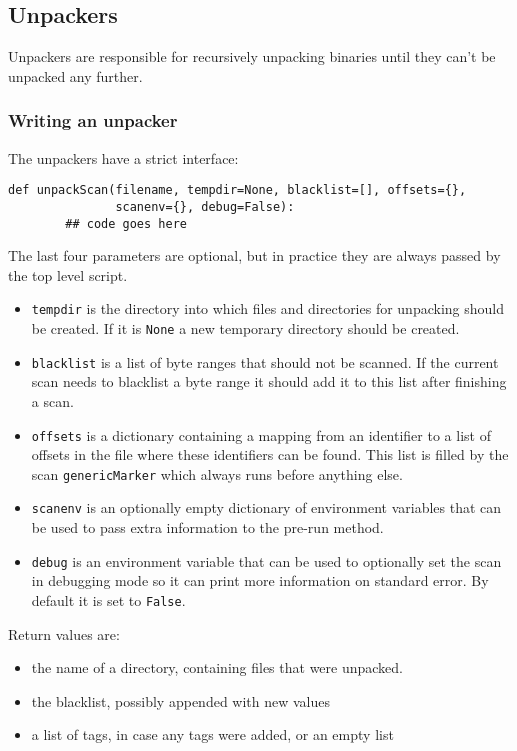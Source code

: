 \documentclass[10pt,a4paper]{article}
\begin{document}
\subsection{Unpackers}

Unpackers are responsible for recursively unpacking binaries until they
can't be unpacked any further.

\subsubsection{Writing an unpacker}

The unpackers have a strict interface:

\begin{verbatim}
def unpackScan(filename, tempdir=None, blacklist=[], offsets={},
               scanenv={}, debug=False):
        ## code goes here
\end{verbatim}

The last four parameters are optional, but in practice they are always passed
by the top level script.

\begin{itemize}
\item \texttt{tempdir} is the directory into which files and directories for
unpacking should be created. If it is \texttt{None} a new temporary directory
should be created.
\item \texttt{blacklist} is a list of byte ranges that should not be scanned.
If the current scan needs to blacklist a byte range it should add it to this
list after finishing a scan.
\item \texttt{offsets} is a dictionary containing a mapping from an identifier
to a list of offsets in the file where these identifiers can be found. This
list is filled by the scan \texttt{genericMarker} which always runs before
anything else.
\item \texttt{scanenv} is an optionally empty dictionary of environment variables
that can be used to pass extra information to the pre-run method.
\item \texttt{debug} is an environment variable that can be used to optionally
set the scan in debugging mode so it can print more information on standard
error. By default it is set to \texttt{False}.
\end{itemize}

Return values are:

\begin{itemize}
\item the name of a directory, containing files that were unpacked.
\item the blacklist, possibly appended with new values
\item a list of tags, in case any tags were added, or an empty list
\end{itemize}
\end{document}
